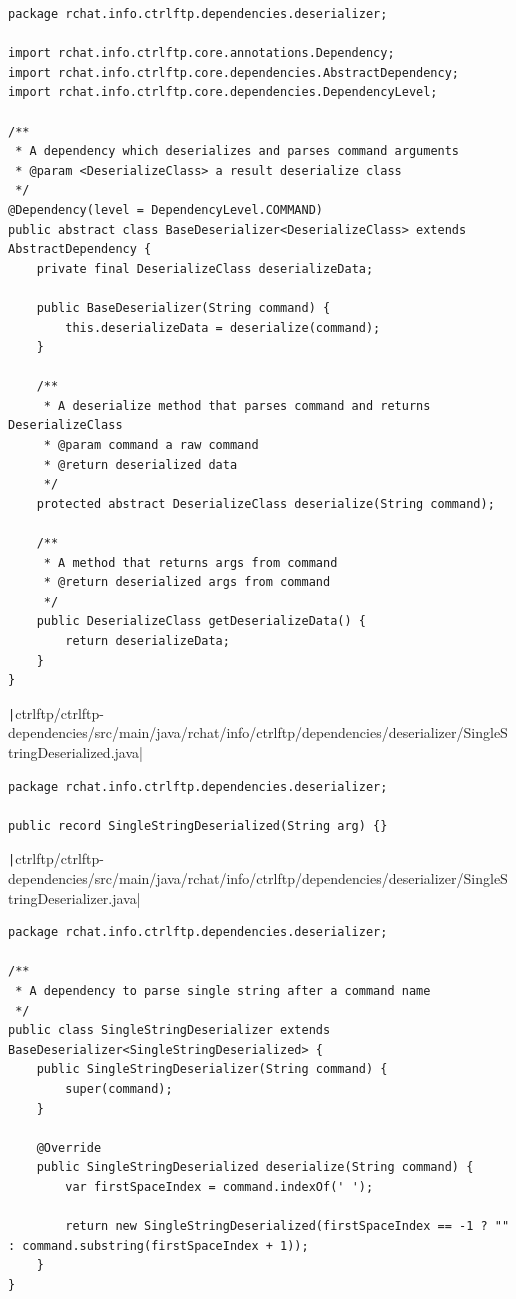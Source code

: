 \documentclass[a4paper,14pt]{extarticle}
\begin{document}
\begin{verbatim}
package rchat.info.ctrlftp.dependencies.deserializer;

import rchat.info.ctrlftp.core.annotations.Dependency;
import rchat.info.ctrlftp.core.dependencies.AbstractDependency;
import rchat.info.ctrlftp.core.dependencies.DependencyLevel;

/**
 * A dependency which deserializes and parses command arguments
 * @param <DeserializeClass> a result deserialize class
 */
@Dependency(level = DependencyLevel.COMMAND)
public abstract class BaseDeserializer<DeserializeClass> extends AbstractDependency {
    private final DeserializeClass deserializeData;

    public BaseDeserializer(String command) {
        this.deserializeData = deserialize(command);
    }

    /**
     * A deserialize method that parses command and returns DeserializeClass
     * @param command a raw command
     * @return deserialized data
     */
    protected abstract DeserializeClass deserialize(String command);

    /**
     * A method that returns args from command
     * @return deserialized args from command
     */
    public DeserializeClass getDeserializeData() {
        return deserializeData;
    }
}
\end{verbatim}
\texttt|ctrlftp/ctrlftp-dependencies/src/main/java/rchat/info/ctrlftp/dependencies/deserializer/SingleStringDeserialized.java|
\begin{verbatim}
package rchat.info.ctrlftp.dependencies.deserializer;

public record SingleStringDeserialized(String arg) {}
\end{verbatim}
\texttt|ctrlftp/ctrlftp-dependencies/src/main/java/rchat/info/ctrlftp/dependencies/deserializer/SingleStringDeserializer.java|
\begin{verbatim}
package rchat.info.ctrlftp.dependencies.deserializer;

/**
 * A dependency to parse single string after a command name
 */
public class SingleStringDeserializer extends BaseDeserializer<SingleStringDeserialized> {
    public SingleStringDeserializer(String command) {
        super(command);
    }

    @Override
    public SingleStringDeserialized deserialize(String command) {
        var firstSpaceIndex = command.indexOf(' ');

        return new SingleStringDeserialized(firstSpaceIndex == -1 ? "" : command.substring(firstSpaceIndex + 1));
    }
}
\end{verbatim}
\end{document}

